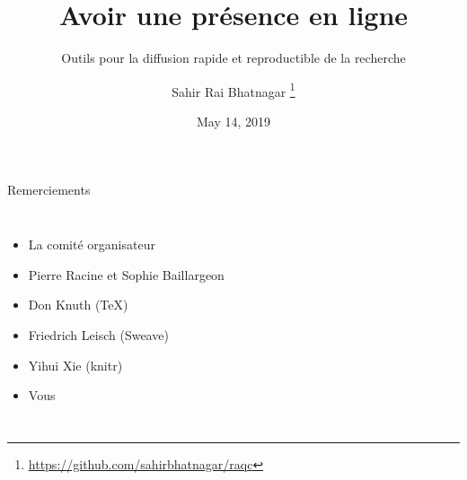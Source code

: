 \documentclass[10pt]{beamer}\usepackage[]{graphicx}\usepackage[]{color}
\begin{document}
\title[Outils pour la diffusion rapide et reproductible de la recherche]{Avoir une présence en ligne}
\subtitle{Outils pour la diffusion rapide et reproductible de la recherche}

\author[]{Sahir Rai Bhatnagar%
\thanks{\href{https://github.com/sahirbhatnagar/raqc}{https://github.com/sahirbhatnagar/raqc}%
}}

\date{May 14, 2019}


\maketitle

\begin{frame}{Remerciements}
\begin{columns}[c] %


\begin{itemize}
\item La comité organisateur
\item Pierre Racine et Sophie Baillargeon
\item Don Knuth (\TeX)
\item Friedrich Leisch (Sweave)
\item Yihui Xie (knitr)
\item Vous
\end{itemize}


\end{columns}
\end{frame}
\end{document}
